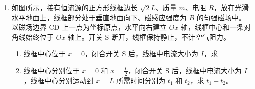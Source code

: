\documentclass[\gkver]{gaokaozhenti}
\begin{document}
\begin{enumerate}
{水平方向

$L_{FG} + L_{GH} + L_{HI} = v_{F}'\cos37^{\circ}t_{2}$

结合

$mgh_{2} = \frac{1}{2}mv_{0}'''^{2}$，$mv_{0}''' = 2mv_{C}'''$

$-2mgL\sin37^{\circ} - \mu \cdot 2mg\cos37^{\circ}L = \frac{1}{2} \times 2mv_{F}'^{2} - \frac{1}{2} \times 2mv_{C}'''^{2}$

联立解得 $h_{2} = 2 \Um$
}

\item
如图所示，接有恒流源的正方形线框边长 $\sqrt{2}L$、质量 $m$、电阻 $R$，放在光滑水平地面上，线框部分处于垂直地面向下、磁感应强度为 $B$ 的匀强磁场中。以磁场边界 CD 上一点为坐标原点，水平向右建立 $Ox$ 轴，线框中心和一条对角线始终位于 $Ox$ 轴上。开关 S 断开，线框保持静止，不计空气阻力。

\begin{enumerate}
\item
线框中心位于 $x = 0$，闭合开关 S 后，线框中电流大小为 $I$，求


\item
线框中心分别位于 $x = 0$ 和 $x = \frac{L}{2}$，闭合开关 S 后，线框中电流大小为 $I$，线框中心分别运动到 $x = L$ 所需时间分别为 $t_{1}$ 和 $t_{2}$，求 $t_{1} - t_{2}$。
\end{enumerate}


\end{enumerate}
\end{document}
